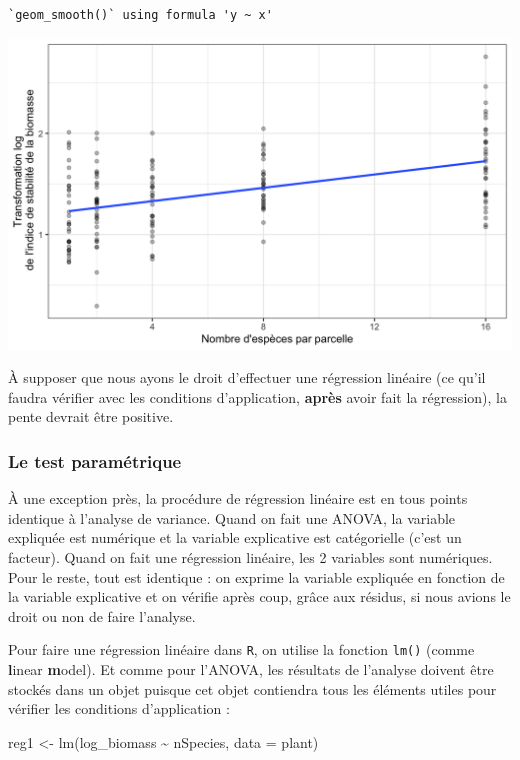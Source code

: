 \documentclass[
  a4paper,
]{article}
\newenvironment{Shaded}{\begin{snugshade}}{\end{snugshade}}
\newcommand{\AttributeTok}[1]{\textcolor[rgb]{0.00,0.34,0.68}{#1}}
\newcommand{\FunctionTok}[1]{\textcolor[rgb]{0.39,0.29,0.61}{#1}}
\newcommand{\NormalTok}[1]{\textcolor[rgb]{0.12,0.11,0.11}{#1}}
\newcommand{\OtherTok}[1]{\textcolor[rgb]{0.00,0.43,0.16}{#1}}
\newcommand{\SpecialCharTok}[1]{\textcolor[rgb]{0.24,0.68,0.91}{#1}}
\begin{document}
\begin{verbatim}
`geom_smooth()` using formula 'y ~ x'
\end{verbatim}

\begin{center}\includegraphics[width=0.9\linewidth]{figure/unnamed-chunk-118-1} \end{center}

À supposer que nous ayons le droit d'effectuer une régression linéaire (ce qu'il faudra vérifier avec les conditions d'application, \textbf{après} avoir fait la régression), la pente devrait être positive.

\hypertarget{le-test-paramuxe9trique-5}{%
\subsubsection{Le test paramétrique}\label{le-test-paramuxe9trique-5}}

À une exception près, la procédure de régression linéaire est en tous points identique à l'analyse de variance. Quand on fait une ANOVA, la variable expliquée est numérique et la variable explicative est catégorielle (c'est un facteur). Quand on fait une régression linéaire, les 2 variables sont numériques. Pour le reste, tout est identique : on exprime la variable expliquée en fonction de la variable explicative et on vérifie après coup, grâce aux résidus, si nous avions le droit ou non de faire l'analyse.

Pour faire une régression linéaire dans \texttt{R}, on utilise la fonction \texttt{lm()} (comme \textbf{l}inear \textbf{m}odel). Et comme pour l'ANOVA, les résultats de l'analyse doivent être stockés dans un objet puisque cet objet contiendra tous les éléments utiles pour vérifier les conditions d'application :

\begin{Shaded}
\begin{Highlighting}[]
\NormalTok{reg1 }\OtherTok{\textless{}{-}} \FunctionTok{lm}\NormalTok{(log\_biomass }\SpecialCharTok{\textasciitilde{}}\NormalTok{ nSpecies, }\AttributeTok{data =}\NormalTok{ plant)}
\end{Highlighting}
\end{Shaded}
\end{document}
